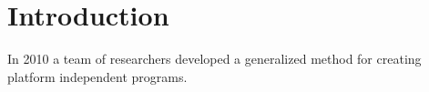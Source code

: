\chapter{Introduction}

In 2010 a team of researchers developed a generalized method for creating platform independent
programs\cite{Brumley2010}. 
